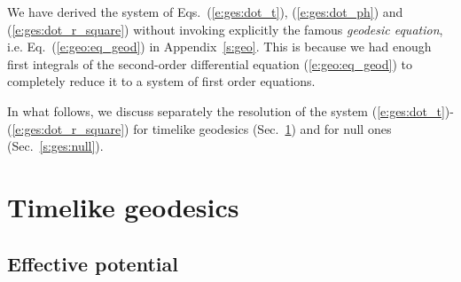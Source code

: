 \begin{remark}
We have derived the system of Eqs.~(\ref{e:ges:dot_t}), (\ref{e:ges:dot_ph}) and (\ref{e:ges:dot_r_square}) without invoking explicitly the
famous \emph{geodesic equation}, i.e.
Eq.~(\ref{e:geo:eq_geod}) in Appendix~\ref{s:geo}.
This is because we had enough
first integrals of the second-order differential equation
(\ref{e:geo:eq_geod})
to completely reduce it to
a system of first order equations.
\end{remark}

In what follows, we discuss separately the resolution of
the system (\ref{e:ges:dot_t})-(\ref{e:ges:dot_r_square}) for timelike geodesics
(Sec.~\ref{s:ges:timelike}) and for null ones (Sec.~\ref{s:ges:null}).


\section{Timelike geodesics} \label{s:ges:timelike}

\subsection{Effective potential} \label{s:ges:eff_pot_timelike}


